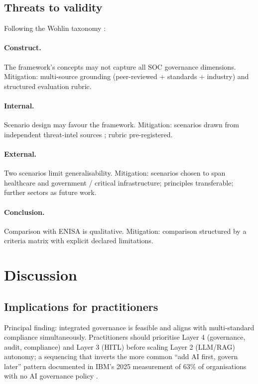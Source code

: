 \documentclass[preprint,12pt,authoryear]{elsarticle}
\begin{document}
\subsection{Threats to validity}
Following the Wohlin taxonomy \citep{wohlin2012experimentation}:

\paragraph{Construct.} The framework's concepts may not capture all SOC governance dimensions. Mitigation: multi-source grounding (peer-reviewed + standards + industry) and structured evaluation rubric.

\paragraph{Internal.} Scenario design may favour the framework. Mitigation: scenarios drawn from independent threat-intel sources \citep{dbir2025,mddr2025,enisa2025,xforce2025}; rubric pre-registered.

\paragraph{External.} Two scenarios limit generalisability. Mitigation: scenarios chosen to span healthcare and government / critical infrastructure; principles transferable; further sectors as future work.

\paragraph{Conclusion.} Comparison with ENISA is qualitative. Mitigation: comparison structured by a criteria matrix with explicit declared limitations.

\section{Discussion}
\label{sec:discussion}

\subsection{Implications for practitioners}
Principal finding: integrated governance is feasible and aligns with multi-standard compliance simultaneously. Practitioners should prioritise Layer 4 (governance, audit, compliance) and Layer 3 (HITL) before scaling Layer 2 (LLM/RAG) autonomy; a sequencing that inverts the more common ``add AI first, govern later'' pattern documented in IBM's 2025 measurement of 63\% of organisations with no AI governance policy \citep{ibm2025costbreach}.
\end{document}
